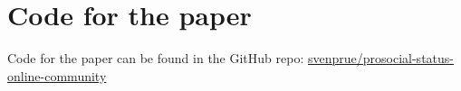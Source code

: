 \section{Code for the paper}
Code for the paper can be found in the GitHub repo: \href{https://github.com/svenprue/prosocial-status-online-community}{svenprue/prosocial-status-online-community}

